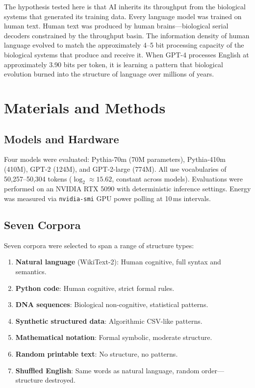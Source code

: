 \documentclass[11pt]{article}
\begin{document}
The hypothesis tested here is that AI inherits its throughput from the biological systems that generated its training data. Every language model was trained on human text. Human text was produced by human brains---biological serial decoders constrained by the throughput basin. The information density of human language evolved to match the approximately 4--5 bit processing capacity of the biological systems that produce and receive it. When GPT-4 processes English at approximately 3.90 bits per token, it is learning a pattern that biological evolution burned into the structure of language over millions of years.

\section{Materials and Methods}

\subsection{Models and Hardware}

Four models were evaluated: Pythia-70m (70M parameters), Pythia-410m (410M), GPT-2 (124M), and GPT-2-large (774M). All use vocabularies of 50,257--50,304 tokens ($\log_2 \approx 15.62$, constant across models). Evaluations were performed on an NVIDIA RTX 5090 with deterministic inference settings. Energy was measured via \texttt{nvidia-smi} GPU power polling at 10\,ms intervals.

\subsection{Seven Corpora}

Seven corpora were selected to span a range of structure types:
\begin{enumerate}
\item \textbf{Natural language} (WikiText-2): Human cognitive, full syntax and semantics.
\item \textbf{Python code}: Human cognitive, strict formal rules.
\item \textbf{DNA sequences}: Biological non-cognitive, statistical patterns.
\item \textbf{Synthetic structured data}: Algorithmic CSV-like patterns.
\item \textbf{Mathematical notation}: Formal symbolic, moderate structure.
\item \textbf{Random printable text}: No structure, no patterns.
\item \textbf{Shuffled English}: Same words as natural language, random order---structure destroyed.
\end{enumerate}
\end{document}
